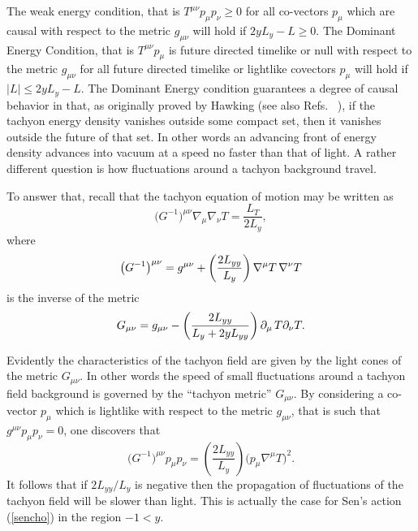 \documentclass[a4paper,12pt]{article}
\begin{document}
The weak energy condition, that is $T^{\mu \nu} p_\mu p_\nu \ge 0$
for all co-vectors $p_\mu$ which are causal with respect to the
metric $g_{\mu \nu}$  will hold if  $ 2y L_y-L \ge 0$. The
Dominant Energy Condition, that is $T^{\mu \nu} p_\mu$ is future
directed timelike or null with respect to the metric $g_{\mu \nu}$
for all future directed timelike or lightlike covectors $p_\mu$
will hold if $ |L| \le 2yL_y -L$. The Dominant Energy condition
guarantees a degree of causal behavior in that, as originally
proved by Hawking \cite{Hawking} (see also Refs.\
\cite{Gibbons2, Carter} ),  
if the tachyon energy density vanishes outside some
compact set, then it vanishes outside the future of that set. In
other words an advancing front of  energy density advances into
vacuum at a speed no faster than that of light. A rather different
question is how fluctuations around a  tachyon background travel.


To answer that,  recall that the tachyon equation of motion may be
written as 
\begin{equation} 
\bigl ( G^{-1} \bigr )  ^{\mu \nu} \nabla _\mu
\nabla _\nu T = \frac{L_T}{2 L_y} , 
\end{equation}
where \begin{equation} 
\bigl (G^{-1} \bigr ) ^{\mu \nu} = g^{\mu \nu} + 
\left( \frac{2 L_{yy}}{L_y} \right)  \nabla ^\mu T \thinspace \nabla
^ \nu T 
\label{inverse}
\end{equation} 
is the inverse of the metric
\begin{equation} 
G_{\mu\nu} = g_{\mu \nu} - 
\left( \frac{2 L_{yy}}{L_y + 2 y L_{yy}}\right)
\partial _\mu \thinspace T \partial _\nu T .  
\label{inversem}
\end{equation}

Evidently the characteristics of the tachyon field are given by
the light cones of the metric $G_{\mu \nu}$. In other words the
speed of small fluctuations around a tachyon field background is
governed by the ``tachyon metric'' $G_{\mu \nu}$.   By considering
a co-vector $p_\mu$ which is lightlike with respect to the metric
$g_{\mu \nu}$, that is such that $g^{\mu \nu} p_\mu p_\nu =0$, one
discovers that
\begin{equation} \bigl ( G^{-1}\bigr ) ^{\mu
\nu} p_\mu p_\nu=  \left(\frac{2L_{yy}}{L_y}\right)  \bigl(p_\mu
\nabla ^\mu T \bigr ) ^2 . 
\end{equation} 
It follows that if $2 L_{yy} / L_y$ 
is negative then the propagation of fluctuations of the
tachyon field will be slower than light. This is actually the case
for Sen's action (\ref{sencho}) in the region $-1 < y$.
\end{document}
